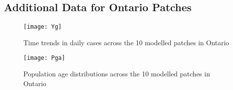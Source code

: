 \subsection{Additional Data for Ontario Patches}\label{app.covid}
\begin{figure}[ht]
  \centering
  \texttt{[image: Yg]}
  \caption{Time trends in daily \covid cases across the 10 modelled patches in Ontario}
  \label{fig:Yg}
\end{figure}
\begin{figure}[ht]
  \centering
  \texttt{[image: Pga]}
  \caption{Population age distributions across the 10 modelled patches in Ontario}
  \label{fig:Pga}
\end{figure}